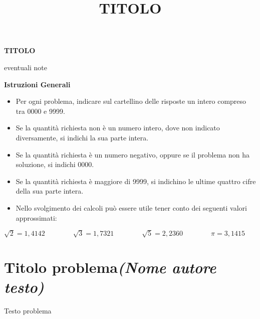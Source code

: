 \documentclass[11pt]{article}
\date{}
\title{\textbf{TITOLO}}
\begin{document}
\begin{center}
\huge\textbf{TITOLO}
\end{center}
\begin{center}
eventuali note


\end{center}
\begin{mdframed}
\begin{center}
\textbf{Istruzioni Generali}
\end{center}
\begin{itemize}
\item Per ogni problema, indicare sul cartellino delle risposte un intero compreso tra 0000 e 9999.
\item Se la quantità richiesta non è un numero intero, dove non indicato diversamente, si indichi la sua parte intera.
\item Se la quantità richiesta è un numero negativo, oppure se il problema non ha soluzione, si indichi 0000.
\item Se la quantità richiesta è maggiore di 9999, si indichino le ultime quattro cifre della sua parte intera.
\item Nello svolgimento dei calcoli può essere utile tener conto dei seguenti valori approssimati:
\end{itemize}

\begin{center}
$\sqrt2 = 1,4142 \qquad \qquad \sqrt3 = 1,7321 \qquad \qquad \sqrt5 = 2,2360 \qquad \qquad \pi = 3,1415$
\end{center}
\end{mdframed}

\section{Titolo problema\hfill\normalsize\normalfont \emph{(Nome autore testo)}}
Testo problema
\end{document}
